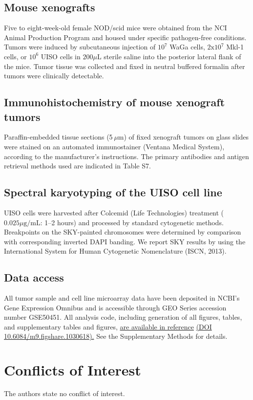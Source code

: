 \documentclass[10pt]{article}
\begin{document}
\subsection*{Mouse xenografts}
Five to eight-week-old female NOD/scid mice were obtained from the NCI Animal Production Program and housed under specific pathogen-free conditions.
Tumors were induced by subcutaneous injection of $10^7$ WaGa cells, $2\mathrm{x}10^7$ Mkl-1 cells, or $10^6$ UISO cells in $200\mu\mathrm{L}$ sterile saline into the posterior lateral flank of the mice.
Tumor tissue was collected and fixed in neutral buffered formalin after tumors were clinically detectable.

\subsection*{Immunohistochemistry of mouse xenograft tumors}
Paraffin-embedded tissue sections (5 $\mu\mathrm{m}$) of fixed xenograft tumors on glass slides were stained on an automated immunostainer (Ventana Medical System), according to the manufacturer's instructions.
The primary antibodies and antigen retrieval methods used are indicated in Table S7.

\subsection*{Spectral karyotyping of the UISO cell line}
UISO cells were harvested after Colcemid (Life Technologies) treatment ($0.025 \mu\textrm{g/mL}$: 1–2 hours) and processed by standard cytogenetic methods.
Breakpoints on the SKY-painted chromosomes were determined by comparison with corresponding inverted DAPI banding.
We report SKY results by using the International System for Human Cytogenetic Nomenclature (ISCN, 2013).

\subsection*{Data access}
All tumor sample and cell line microarray data have been deposited in NCBI's Gene Expression Omnibus \citep{Edgar2002Gene} and is accessible through GEO Series accession number GSE50451.
All analysis code, including generation of all figures, tables, and supplementary tables and figures, \uline{are available in reference} \cite{DailyUISOReproducible2014} \uline{(DOI 10.6084/m9.figshare.1030618).}
See the Supplementary Methods for details.

\section*{Conflicts of Interest}
The authors state no conflict of interest.
\end{document}
